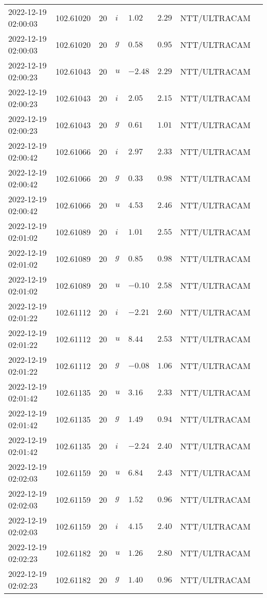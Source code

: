 \documentclass{nature_plusfigure}
\begin{document}
\begin{supplement}
\begin{center}
\begin{longtable}{llllllll}
2022-12-19 02:00:03 & 102.61020 & 20 & $i$ & $1.02$ & $2.29$ & NTT/ULTRACAM &  \\ 
2022-12-19 02:00:03 & 102.61020 & 20 & $g$ & $0.58$ & $0.95$ & NTT/ULTRACAM &  \\ 
2022-12-19 02:00:23 & 102.61043 & 20 & $u$ & $-2.48$ & $2.29$ & NTT/ULTRACAM &  \\ 
2022-12-19 02:00:23 & 102.61043 & 20 & $i$ & $2.05$ & $2.15$ & NTT/ULTRACAM &  \\ 
2022-12-19 02:00:23 & 102.61043 & 20 & $g$ & $0.61$ & $1.01$ & NTT/ULTRACAM &  \\ 
2022-12-19 02:00:42 & 102.61066 & 20 & $i$ & $2.97$ & $2.33$ & NTT/ULTRACAM &  \\ 
2022-12-19 02:00:42 & 102.61066 & 20 & $g$ & $0.33$ & $0.98$ & NTT/ULTRACAM &  \\ 
2022-12-19 02:00:42 & 102.61066 & 20 & $u$ & $4.53$ & $2.46$ & NTT/ULTRACAM &  \\ 
2022-12-19 02:01:02 & 102.61089 & 20 & $i$ & $1.01$ & $2.55$ & NTT/ULTRACAM &  \\ 
2022-12-19 02:01:02 & 102.61089 & 20 & $g$ & $0.85$ & $0.98$ & NTT/ULTRACAM &  \\ 
2022-12-19 02:01:02 & 102.61089 & 20 & $u$ & $-0.10$ & $2.58$ & NTT/ULTRACAM &  \\ 
2022-12-19 02:01:22 & 102.61112 & 20 & $i$ & $-2.21$ & $2.60$ & NTT/ULTRACAM &  \\ 
2022-12-19 02:01:22 & 102.61112 & 20 & $u$ & $8.44$ & $2.53$ & NTT/ULTRACAM &  \\ 
2022-12-19 02:01:22 & 102.61112 & 20 & $g$ & $-0.08$ & $1.06$ & NTT/ULTRACAM &  \\ 
2022-12-19 02:01:42 & 102.61135 & 20 & $u$ & $3.16$ & $2.33$ & NTT/ULTRACAM &  \\ 
2022-12-19 02:01:42 & 102.61135 & 20 & $g$ & $1.49$ & $0.94$ & NTT/ULTRACAM &  \\ 
2022-12-19 02:01:42 & 102.61135 & 20 & $i$ & $-2.24$ & $2.40$ & NTT/ULTRACAM &  \\ 
2022-12-19 02:02:03 & 102.61159 & 20 & $u$ & $6.84$ & $2.43$ & NTT/ULTRACAM &  \\ 
2022-12-19 02:02:03 & 102.61159 & 20 & $g$ & $1.52$ & $0.96$ & NTT/ULTRACAM &  \\ 
2022-12-19 02:02:03 & 102.61159 & 20 & $i$ & $4.15$ & $2.40$ & NTT/ULTRACAM &  \\ 
2022-12-19 02:02:23 & 102.61182 & 20 & $u$ & $1.26$ & $2.80$ & NTT/ULTRACAM &  \\ 
2022-12-19 02:02:23 & 102.61182 & 20 & $g$ & $1.40$ & $0.96$ & NTT/ULTRACAM &  \\ 

\end{longtable}
\end{center}
\end{supplement}
\end{document}
